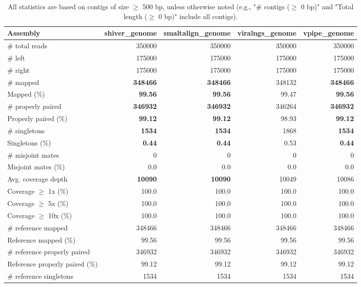 \documentclass[12pt,a4paper]{article}
\begin{document}
\begin{table}[ht]
\begin{center}
\caption{All statistics are based on contigs of size $\geq$ 500 bp, unless otherwise noted (e.g., "\# contigs ($\geq$ 0 bp)" and "Total length ($\geq$ 0 bp)" include all contigs).}
\begin{tabular}{|l*{4}{|r}|}
\hline
Assembly & shiver\_genome & smaltalign\_genome & viralngs\_genome & vpipe\_genome \\ \hline
\# total reads & 350000 & 350000 & 350000 & 350000 \\ \hline
\# left & 175000 & 175000 & 175000 & 175000 \\ \hline
\# right & 175000 & 175000 & 175000 & 175000 \\ \hline
\# mapped & {\bf 348466} & {\bf 348466} & 348132 & {\bf 348466} \\ \hline
Mapped (\%) & {\bf 99.56} & {\bf 99.56} & 99.47 & {\bf 99.56} \\ \hline
\# properly paired & {\bf 346932} & {\bf 346932} & 346264 & {\bf 346932} \\ \hline
Properly paired (\%) & {\bf 99.12} & {\bf 99.12} & 98.93 & {\bf 99.12} \\ \hline
\# singletons & {\bf 1534} & {\bf 1534} & 1868 & {\bf 1534} \\ \hline
Singletons (\%) & {\bf 0.44} & {\bf 0.44} & 0.53 & {\bf 0.44} \\ \hline
\# misjoint mates & 0 & 0 & 0 & 0 \\ \hline
Misjoint mates (\%) & 0.0 & 0.0 & 0.0 & 0.0 \\ \hline
Avg. coverage depth & {\bf 10090} & {\bf 10090} & 10049 & 10086 \\ \hline
Coverage $\geq$ 1x (\%) & 100.0 & 100.0 & 100.0 & 100.0 \\ \hline
Coverage $\geq$ 5x (\%) & 100.0 & 100.0 & 100.0 & 100.0 \\ \hline
Coverage $\geq$ 10x (\%) & 100.0 & 100.0 & 100.0 & 100.0 \\ \hline
\# reference mapped & 348466 & 348466 & 348466 & 348466 \\ \hline
Reference mapped (\%) & 99.56 & 99.56 & 99.56 & 99.56 \\ \hline
\# reference properly paired & 346932 & 346932 & 346932 & 346932 \\ \hline
Reference properly paired (\%) & 99.12 & 99.12 & 99.12 & 99.12 \\ \hline
\# reference singletons & 1534 & 1534 & 1534 & 1534 \\ \hline

\end{tabular}
\end{center}
\end{table}
\end{document}
